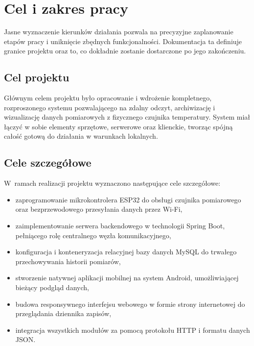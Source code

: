 \chapter{Cel i zakres pracy}
Jasne wyznaczenie kierunków działania pozwala na precyzyjne zaplanowanie etapów pracy i uniknięcie zbędnych funkcjonalności. Dokumentacja ta definiuje granice projektu oraz to, co dokładnie zostanie dostarczone po jego zakończeniu.
\section{Cel projektu}
Głównym celem projektu było opracowanie i wdrożenie kompletnego, rozproszonego systemu pozwalającego na zdalny odczyt, archiwizację i wizualizację danych pomiarowych z fizycznego czujnika temperatury. System miał łączyć w sobie elementy sprzętowe, serwerowe oraz klienckie, tworząc spójną całość gotową do działania w warunkach lokalnych.

\section{Cele szczegółowe}
W~ramach realizacji projektu wyznaczono następujące cele szczegółowe:
\begin{itemize}
    \item zaprogramowanie mikrokontrolera ESP32 do obsługi czujnika pomiarowego oraz bezprzewodowego przesyłania danych przez Wi-Fi,
    \item zaimplementowanie serwera backendowego w technologii Spring Boot, pełniącego rolę centralnego węzła komunikacyjnego,
    \item konfiguracja i konteneryzacja relacyjnej bazy danych MySQL do trwałego przechowywania historii pomiarów,
    \item stworzenie natywnej aplikacji mobilnej na system Android, umożliwiającej bieżący podgląd danych,
    \item budowa responsywnego interfejsu webowego w formie strony internetowej do przeglądania dziennika zapisów,
    \item integracja wszystkich modułów za pomocą protokołu HTTP i formatu danych JSON.
\end{itemize}

